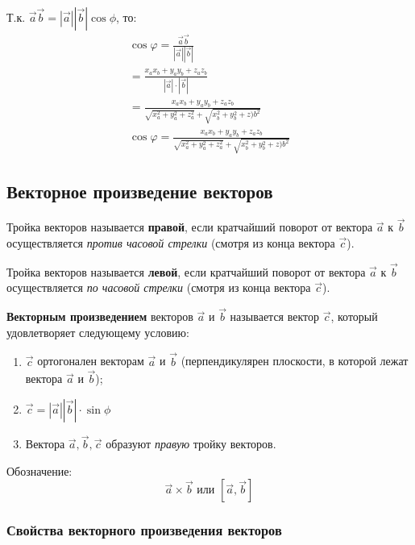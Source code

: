Т.к. $\vec{a} \vec{b} = |\vec{a}| |\vec{b}| \cos \phi$, то:
\begin{gather*}
  \cos \varphi = \frac{\vec{a} \vec{b}}{|\vec{a}| |\vec{b}|} \\
  = \frac{x_a x_b + y_a y_b + z_a z_b}{|\vec{a}| \cdot |\vec{b}|} \\
  = \frac{x_a x_b + y_a y_b + z_a z_b}{\sqrt{x_a^2 + y_a^2 + z_a^2} +\sqrt{x_b^2 + y_b^2 + z)b^2} } \\
  \boxed{\cos \varphi = \frac{x_a x_b + y_a y_b + z_a z_b}{\sqrt{x_a^2 + y_a^2 + z_a^2} +\sqrt{x_b^2 + y_b^2 + z)b^2}}}
\end{gather*}


\subsection{Векторное произведение векторов}

\begin{definition}
  Тройка векторов называется \textbf{правой}, если кратчайший поворот от вектора $\vec{a}$ к $\vec{b}$ осуществляется \textit{против часовой стрелки} (смотря из конца вектора $\vec{c}$).
\end{definition}

\begin{definition}
  Тройка векторов называется \textbf{левой}, если кратчайший поворот от вектора $\vec{a}$ к $\vec{b}$ осуществляется \textit{по часовой стрелки} (смотря из конца вектора $\vec{c}$).
\end{definition}

\begin{definition}
  \textbf{Векторным произведением} векторов $\vec{a}$ и $\vec{b}$ называется вектор $\vec{c}$, который удовлетворяет следующему условию:
  \begin{enumerate}
    \item $\vec{c}$ ортогонален векторам $\vec{a}$ и $\vec{b}$ (перпендикулярен плоскости, в которой лежат вектора $\vec{a}$ и $\vec{b}$);
    \item $\vec{c} = |\vec{a}| |\vec{b}| \cdot \sin \phi$
    \item Вектора $\vec{a}, \vec{b}, \vec{c}$ образуют \textit{правую} тройку векторов.
  \end{enumerate}
  Обозначение: \[
    \vec{a} \times \vec{b} \text{ или } [\vec{a}, \vec{b}]
  \] 
\end{definition}

\subsubsection{Свойства векторного произведения векторов}

